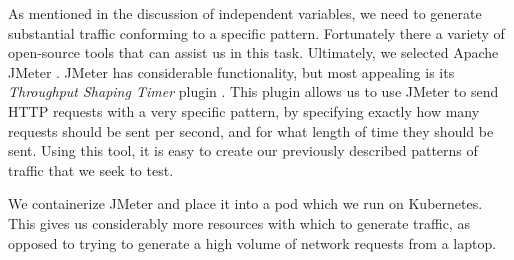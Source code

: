 As mentioned in the discussion of independent variables, we need to generate
substantial traffic conforming to a specific pattern. Fortunately there a
variety of open-source tools that can assist us in this task. Ultimately,
we selected Apache JMeter \cite{apache-jmeter}. JMeter has
considerable functionality, but most appealing is its \textit{Throughput Shaping
Timer} plugin \cite{throughput-shaping-timer-plugin}. This plugin allows us to
use JMeter to send HTTP requests with a very specific pattern, by specifying
exactly how many requests should be sent per second, and for what length of time
they should be sent. Using this tool, it is easy to create our previously
described patterns of traffic that we seek to test.

We containerize JMeter and place it into a pod which we run on Kubernetes. This
gives us considerably more resources with which to generate traffic, as opposed
to trying to generate a high volume of network requests from a laptop.
